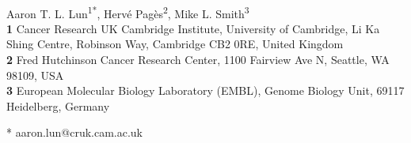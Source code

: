 \documentclass[10pt,letterpaper]{article}
\date{}
\begin{document}
\begin{flushleft}
{\Large
\textbf{} %
}
\newline
\\

Aaron T. L. Lun\textsuperscript{1*},
Herv\'e Pag\`es\textsuperscript{2},
Mike L. Smith\textsuperscript{3}
\\
\bigskip
\textbf{1} Cancer Research UK Cambridge Institute, University of Cambridge, Li Ka Shing Centre, Robinson Way, Cambridge CB2 0RE, United Kingdom 
\\
\textbf{2} Fred Hutchinson Cancer Research Center, 1100 Fairview Ave N, Seattle, WA 98109, USA
 \\
\textbf{3} European Molecular Biology Laboratory (EMBL), Genome Biology Unit, 69117 Heidelberg, Germany
\\
\bigskip


* aaron.lun@cruk.cam.ac.uk

\end{flushleft}
\end{document}
